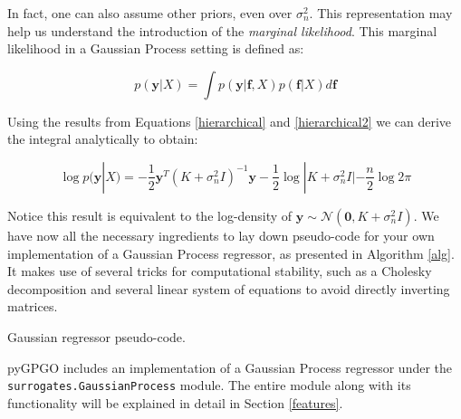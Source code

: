 \documentclass[10pt,a4paper,twoside]{book}
\begin{document}
In fact, one can also assume other priors, even over $\sigma_n^2$. This representation may help us understand the introduction of the \textit{marginal likelihood}. This marginal likelihood in a Gaussian Process setting is defined as:

\begin{equation}\label{marglike}
p(\boldsymbol{y}|X) = \int p(\boldsymbol{y}|\boldsymbol{f}, X)p(\boldsymbol{f}|X) d\boldsymbol{f}
\end{equation}

Using the results from Equations \ref{hierarchical} and \ref{hierarchical2} we can derive the integral analytically to obtain:

\begin{equation}
\log p(\boldsymbol{y}|X) = - \dfrac{1}{2}\boldsymbol{y}^T(K + \sigma^2_n I)^{-1}\boldsymbol{y} - \dfrac{1}{2}\log |K + \sigma^2_n I| - \dfrac{n}{2}\log 2\pi
\end{equation}

Notice this result is equivalent to the log-density of $\boldsymbol{y} \sim \mathcal{N}(\boldsymbol{0}, K + \sigma_n^2 I)$. We have now all the necessary ingredients to lay down pseudo-code for your own implementation of a Gaussian Process regressor, as presented in Algorithm \ref{alg}. It makes use of several tricks for computational stability, such as a Cholesky decomposition and several linear system of equations to avoid directly inverting matrices.\\

\begin{algorithm}
	\caption{Gaussian regressor pseudo-code.}
		\label{alg}
		\begin{algorithmic}[1]
			\EndFunction
		\end{algorithmic}
\end{algorithm}

pyGPGO includes an implementation of a Gaussian Process regressor under the \texttt{surrogates.GaussianProcess} module. The entire module along with its functionality will be explained in detail in Section \ref{features}.
\end{document}
